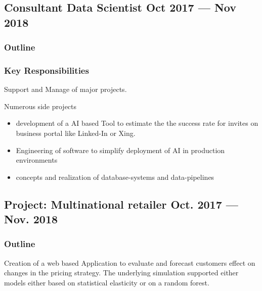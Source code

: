 \documentclass[letter,10pt]{article}
\begin{document}

\subsection{{Consultant Data Scientist \hfill Oct 2017 --- Nov 2018}}

\subsubsection*{{Outline}}

\subsubsection*{{Key Responsibilities}}

\begin{zitemize}
\item Support and Manage of major projects.
\item Numerous side projects \begin{itemize}
	\item development of a AI based Tool to estimate the the success rate for invites on business portal like Linked-In or Xing.
	\item Engineering of software to simplify deployment of AI in production environments 
	\item concepts and realization of database-systems and data-pipelines 
\end{itemize}
\end{zitemize}


\subsection{{Project: Multinational retailer  \hfill Oct.  2017 --- Nov. 2018 }}
\subsubsection*{{Outline}}
Creation of a web based Application to evaluate and forecast customers effect on changes in the pricing strategy. The underlying simulation supported either models either based on statistical elasticity or on a random forest. 
\end{document}
